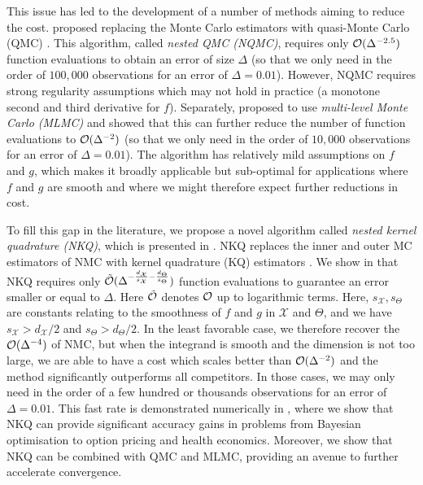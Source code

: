 This issue has led to the development of a number of methods aiming to reduce the cost. \citet{Bartuska2023} proposed replacing the Monte Carlo estimators with quasi-Monte Carlo (QMC) \citep{Dick2013}. This algorithm, called \emph{nested QMC (NQMC)}, requires only $\mathcal{O}(\Delta^{-2.5})$ function evaluations to obtain an error of size $\Delta$ (so that we only need in the order of $100,000$ observations for an error of $\Delta=0.01$). However, NQMC requires strong regularity assumptions which may not hold in practice (a monotone second and third derivative for $f$). Separately, \citet{bujok2015multilevel,Giles2019, giles2019decision} proposed to use \emph{multi-level Monte Carlo (MLMC)} and showed that this can further reduce the number of function evaluations to $\mathcal{O}(\Delta^{-2})$ (so that we only need in the order of $10,000$ observations for an error of $\Delta=0.01$). The algorithm has relatively mild assumptions on $f$ and $g$, which makes it broadly applicable but sub-optimal for applications where $f$ and $g$ are smooth and where we might therefore expect further reductions in cost. 

To fill this gap in the literature, we propose a novel algorithm called \emph{nested kernel quadrature (NKQ)}, which is presented in . NKQ replaces the inner and outer MC estimators of NMC with kernel quadrature (KQ) estimators \citep{sommariva2006numerical}. We show in  that NKQ requires only $\tilde{\mathcal{O}}(\Delta^{-\frac{d_{\mathcal{X}}}{s_{\mathcal{X}}} - \frac{d_\Theta}{s_\Theta}})$ function evaluations to guarantee an error smaller or equal to $\Delta$. Here $\tilde{\mathcal{O}}$ denotes $\mathcal{O}$ up to logarithmic terms. 
Here, $s_{\mathcal{X}}, s_{\Theta}$ are constants relating to the smoothness of $f$ and $g$ in $\mathcal{X}$ and $\Theta$, and we have $s_{\mathcal{X}} > d_{\mathcal{X}}/2$ and $s_{\Theta} > d_{\Theta}/2$. In the least favorable case, we therefore recover the $\mathcal{O}(\Delta^{-4})$ of NMC, but when the integrand is smooth and the dimension is not too large, we are able to have a cost which scales better than $\mathcal{O}(\Delta^{-2})$ and the method significantly outperforms all competitors. In those cases, we may only need in the order of a few hundred or thousands observations for an error of $\Delta=0.01$. This fast rate is demonstrated numerically in , where we show that NKQ can provide significant accuracy gains in problems from Bayesian optimisation to option pricing and health economics. Moreover, we show that NKQ can be combined with QMC and MLMC, providing an avenue to further accelerate convergence.
